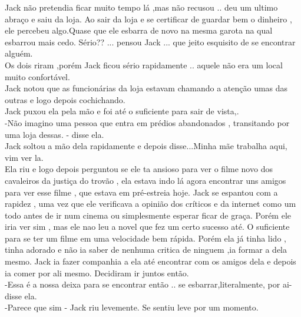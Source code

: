 \documentclass{book}
\begin{document}
Jack não pretendia ficar muito tempo lá ,mas não recusou .. deu um ultimo abraço e saiu da loja. Ao sair da loja e se certificar de guardar bem o dinheiro , ele percebeu algo.Quase que ele esbarra de novo na mesma garota na qual esbarrou mais cedo. 
Sério?? ... pensou Jack ... que jeito esquisito de se encontrar alguém.\\
Os dois riram ,porém Jack ficou sério rapidamente .. aquele não era um local muito confortável.\\
Jack notou que as funcionárias da loja estavam chamando a atenção umas das outras e logo depois cochichando. \\
Jack puxou ela pela mão e foi até o suficiente para sair de vista,.\\
-Não imagino uma pessoa que entra em prédios abandonados , transitando por uma loja dessas. - disse ela.\\
Jack soltou a mão dela rapidamente e depois disse...Minha mãe trabalha aqui, vim ver la. \\
Ela riu e logo depois perguntou se ele ta ansioso para ver o filme novo dos cavaleiros da justiça do trovão , ela estava indo lá agora encontrar uns amigos para ver esse filme , que estava em pré-estreia hoje. Jack se espantou com a rapidez , uma vez que ele verificava a opinião dos críticos e da internet como um todo antes de ir num cinema ou simplesmente esperar ficar de graça. Porém ele iria ver sim , mas ele nao leu a novel que fez um certo sucesso até. O suficiente para se ter um filme em uma velocidade bem rápida. Porém ela já tinha lido , tinha adorado e não ia saber de nenhuma critica de ninguem ,ia formar a dela mesmo. Jack ia fazer companhia a ela até encontrar com os amigos dela e depois ia comer por ali mesmo. Decidiram ir juntos então.\\
-Essa é a nossa deixa para se encontrar então .. se esbarrar,literalmente, por ai- disse ela. \\
-Parece que sim - Jack riu levemente. Se sentiu leve por um momento. \\
\end{document}
